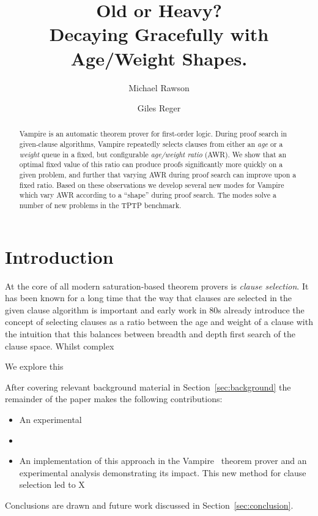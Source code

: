 \documentclass{llncs}
\title{Old or Heavy?\\Decaying Gracefully with Age/Weight Shapes.}
\author{Michael Rawson \and Giles Reger}
\institute{University of Manchester, Manchester, UK}
\begin{document}
\maketitle
\begin{abstract}
Vampire is an automatic theorem prover for first-order logic.
During proof search in given-clause algorithms, Vampire repeatedly selects clauses from either an \emph{age} or a \emph{weight} queue in a fixed, but configurable \emph{age/weight ratio} (AWR).
We show that an optimal fixed value of this ratio can produce proofs significantly more quickly on a given problem, and further that varying AWR during proof search can improve upon a fixed ratio.
Based on these observations we develop several new modes for Vampire which vary AWR according to a ``shape'' during proof search.
The modes solve a number of new problems in the TPTP benchmark.
\end{abstract}

\section{Introduction}
\label{sec:introduction}

At the core of all modern saturation-based theorem provers is \emph{clause selection}. It has been known for a long time that the way that clauses are selected in the given clause algorithm is important and early work in 80s already introduce the concept of selecting clauses as a ratio between the age and weight of a clause with the intuition that this balances between breadth and depth first search of the clause space. Whilst complex 


\cite{DBLP:conf/cade/SchulzM16}

We explore this 


After covering relevant background material in Section~\ref{sec:background} the remainder of the paper makes the following contributions:
\begin{itemize}
	\item An experimental 
	\item 
	\item An implementation of this approach in the Vampire~\cite{vampire} theorem prover and an experimental analysis demonstrating its impact. This new method for clause selection led to X
\end{itemize}
Conclusions are drawn and future work discussed in Section~\ref{sec:conclusion}.
\end{document}

